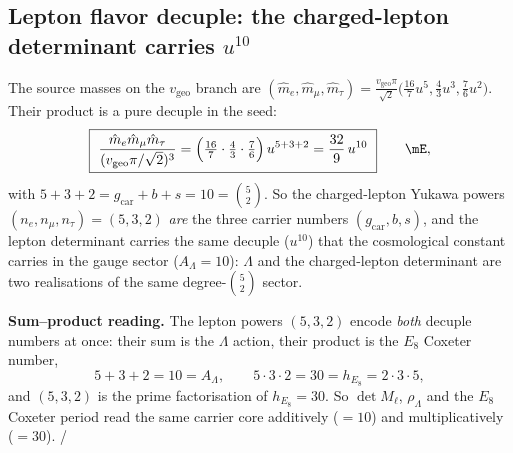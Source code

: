 \documentclass[11pt,a4paper]{article}
\newcommand{\gcar}{g_{\mathrm{car}}}
\newcommand{\useed}{u}
\theoremstyle{definition}
\begin{document}
\subsection{Lepton flavor decuple: the charged-lepton determinant carries $u^{10}$}
The source masses on the $v_{\mathrm{geo}}$ branch are
$(\hat m_e,\hat m_\mu,\hat m_\tau)=\tfrac{v_{\mathrm{geo}}\pi}{\sqrt2}\bigl(\tfrac{16}{7}\useed^5,\tfrac43\useed^3,\tfrac76\useed^2\bigr)$.
Their product is a pure decuple in the seed:
\begin{equation}
  \boxed{\ \frac{\hat m_e\hat m_\mu\hat m_\tau}{(v_{\mathrm{geo}}\pi/\sqrt2)^3}
  =\Bigl(\tfrac{16}{7}\cdot\tfrac43\cdot\tfrac76\Bigr)\,\useed^{5+3+2}
  =\frac{32}{9}\,\useed^{10}\ }\qquad\mE,
\end{equation}
with $5+3+2=\gcar+b+s=10=\binom52$. So the charged-lepton Yukawa powers $(n_e,n_\mu,n_\tau)=(5,3,2)$
\emph{are} the three carrier numbers $(\gcar,b,s)$, and the lepton determinant carries the same
decuple ($u^{10}$) that the cosmological constant carries in the gauge sector ($A_\Lambda=10$):
$\Lambda$ and the charged-lepton determinant are two realisations of the same degree-$\binom52$
sector.

\noindent\textbf{Sum--product reading.} The lepton powers $(5,3,2)$ encode \emph{both} decuple
numbers at once: their sum is the $\Lambda$ action, their product is the $E_8$ Coxeter number,
\begin{equation}
  5+3+2=10=A_\Lambda,\qquad 5\cdot3\cdot2=30=h_{E_8}=2\cdot3\cdot5 ,
\end{equation}
and $(5,3,2)$ is the prime factorisation of $h_{E_8}=30$. So $\det M_\ell$, $\rho_\Lambda$ and the
$E_8$ Coxeter period read the same carrier core additively ($=10$) and multiplicatively ($=30$). \mE/\mC
\end{document}
